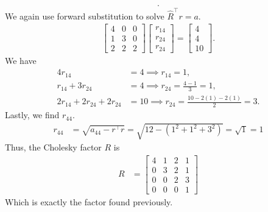 \documentclass{report}
\begin{document}
\begin{remark}
\begin{align*}
    .\end{align*}
    We again use forward substitution to solve $\hat{R}^{\top} r = a$.
    \begin{align*}
        \begin{bmatrix}
            4 & 0 & 0 \\
            1 & 3 & 0 \\
            2 & 2 & 2
        \end{bmatrix}
        \begin{bmatrix}
            r_{14} \\ r_{24} \\ r_{24} 
        \end{bmatrix}
        = \begin{bmatrix}
            4 \\ 4 \\ 10
        \end{bmatrix}
    .\end{align*}
    We have
    \begin{align*}
        4r_{14} &= 4 \implies r_{14} = 1, \\
        r_{14} + 3r_{24} &= 4 \implies r_{24} = \frac{4-1}{3} = 1, \\
        2r_{14} + 2 r_{24} + 2r_{24} &= 10 \implies r_{24} = \frac{10-2(1)-2(1)}{2} = 3
    .\end{align*}
    Lastly, we find $r_{44}$.
    \begin{align*}
        r_{44} &=\sqrt{a_{44} - r^{\top}r}   = \sqrt{12 - (1^{2} + 1^{2} + 3^{2} )} = \sqrt{1} =1
    \end{align*}
    Thus, the Cholesky factor $R$ is 
    \begin{align*}
            R &= \begin{bmatrix} 4 & 1 & 2 & 1 \\ 0 & 3 & 2 & 1 \\ 0 & 0 & 2 & 3 \\ 0 & 0 & 0 &1 \end{bmatrix} 
    \end{align*}
    Which is exactly the factor found previously.
    




\end{remark}
\end{document}
